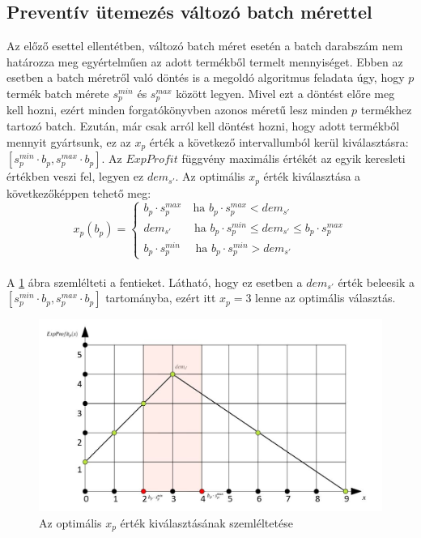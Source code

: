 \documentclass [12pt]{report}
\begin{document}
\subsection{Preventív ütemezés változó batch mérettel} \label{variable_batch_size_modell}
Az előző esettel ellentétben, változó batch méret esetén a batch darabszám nem határozza meg egyértelműen az adott termékből termelt mennyiséget. Ebben az esetben a batch méretről való döntés is a megoldó algoritmus feladata úgy, hogy $p$ termék batch mérete $s_p^{min}$ és $s_p^{max}$ között legyen. Mivel ezt a döntést előre meg kell hozni, ezért minden forgatókönyvben azonos méretű lesz minden $p$ termékhez tartozó batch. Ezután, már csak arról kell döntést hozni, hogy adott termékből mennyit gyártsunk, ez az $x_p$ érték a következő intervallumból kerül kiválasztásra: $[s_p^{min} \cdot b_p , s_p^{max} \cdot b_p]$. Az $ExpProfit$ függvény maximális értékét az egyik keresleti értékben veszi fel, legyen ez $dem_{s'}$. Az optimális $x_p$ érték kiválasztása a következőképpen tehető meg:
\begin{equation*}
x_{p}(b_p)= \begin{cases}
            b_p \cdot s_p^{max} \quad \text{ha } b_p \cdot s_p^{max}<dem_{s'}\\
            dem_{s'} \qquad \text{ha } b_p \cdot s_p^{min} \leq dem_{s'} \leq b_p \cdot s_p^{max}\\
            b_p \cdot s_p^{min} \quad \text{ ha } b_p \cdot s_p^{min}>dem_{s'}
       \end{cases}       
\end{equation*}\\
A \ref{expProfit_func_var} ábra szemlélteti a fentieket. Látható, hogy ez esetben a $dem_{s'}$ érték beleesik a \\$[s_p^{min} \cdot b_p , s_p^{max} \cdot b_p]$ tartományba, ezért itt $x_p=3$ lenne az optimális választás.
\begin{figure}
\begin{center}
\includegraphics[scale=0.5]{expProfit_func_var}
\caption{Az optimális $x_p$ érték kiválasztásának szemléltetése}
\label{expProfit_func_var}
\end{center}
\end{figure}
\end{document}
